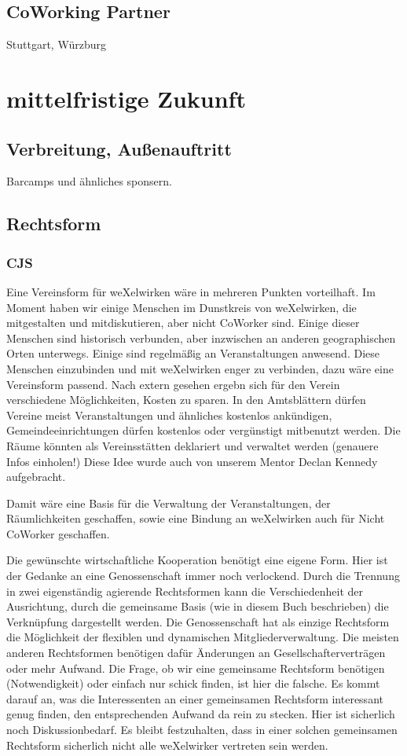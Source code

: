 \begin{appendix}
  \subsection{CoWorking Partner}
  Stuttgart, Würzburg
  \section{mittelfristige Zukunft}
    \subsection{Verbreitung, Außenauftritt}
Barcamps und ähnliches sponsern.
    \subsection{Rechtsform}
      \subsubsection{CJS}
Eine Vereinsform für weXelwirken wäre in mehreren Punkten vorteilhaft.
%
Im Moment haben wir einige Menschen im Dunstkreis von weXelwirken, die mitgestalten und mitdiskutieren, aber nicht CoWorker sind.
%
Einige dieser Menschen sind historisch verbunden, aber inzwischen an anderen geographischen Orten unterwegs.
%
Einige sind regelmäßig an Veranstaltungen anwesend.
%
Diese Menschen einzubinden und mit weXelwirken enger zu verbinden, dazu wäre eine Vereinsform passend.
%
Nach extern gesehen ergebn sich für den Verein verschiedene Möglichkeiten, Kosten zu sparen.
%
In den Amtsblättern dürfen Vereine meist Veranstaltungen und ähnliches kostenlos ankündigen, Gemeindeeinrichtungen dürfen kostenlos oder vergünstigt mitbenutzt werden.
%
Die Räume könnten als Vereinsstätten deklariert und verwaltet werden (genauere Infos einholen!)
%
Diese Idee wurde auch von unserem Mentor Declan Kennedy aufgebracht.



Damit wäre eine Basis für die Verwaltung der Veranstaltungen, der Räumlichkeiten geschaffen, sowie eine Bindung an weXelwirken auch für Nicht CoWorker geschaffen.



Die gewünschte wirtschaftliche Kooperation benötigt eine eigene Form.
%
Hier ist der Gedanke an eine Genossenschaft immer noch verlockend.
%
Durch die Trennung in zwei eigenständig agierende Rechtsformen kann die Verschiedenheit der Ausrichtung, durch die gemeinsame Basis (wie in diesem Buch beschrieben) die Verknüpfung dargestellt werden.
%
Die Genossenschaft hat als einzige Rechtsform die Möglichkeit der flexiblen und dynamischen Mitgliederverwaltung.
%
Die meisten anderen Rechtsformen benötigen dafür Änderungen an Gesellschafterverträgen oder mehr Aufwand.
%
Die Frage, ob wir eine gemeinsame Rechtsform benötigen (Notwendigkeit) oder einfach nur schick finden, ist hier die falsche.
%
Es kommt darauf an, was die Interessenten an einer gemeinsamen Rechtsform interessant genug finden, den entsprechenden Aufwand da rein zu stecken.
%
Hier ist sicherlich noch Diskussionbedarf.
%
Es bleibt festzuhalten, dass in einer solchen gemeinsamen Rechtsform sicherlich nicht alle weXelwirker vertreten sein werden.

\end{appendix}
